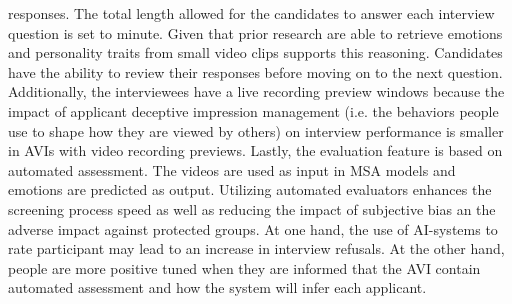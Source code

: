 responses. The total length allowed for the candidates to answer each interview question is set to minute. Given that prior research are able to retrieve emotions and personality traits from small video clips supports this reasoning. Candidates have the ability to review their responses before moving on to the next question. Additionally, the interviewees have a live recording preview windows because the impact of applicant deceptive impression management (i.e. the behaviors people use to shape how they are viewed by others) on interview performance is smaller in AVIs with video recording previews. Lastly, the evaluation feature is based on automated assessment. The videos are used as input in MSA models and emotions are predicted as output. Utilizing automated evaluators enhances the screening process speed as well as reducing the impact of subjective bias an the adverse impact against protected groups. At one hand, the use of AI-systems to rate participant may lead to an increase in interview refusals. At the other hand, people are more positive tuned when they are informed that the AVI contain automated assessment and how the system will infer each applicant. 
%
\begin{table}[h]
    \caption{AVI design features for the experiment.}
    \centering
    \label{tab:our-AVI-design-features}
\end{table}
